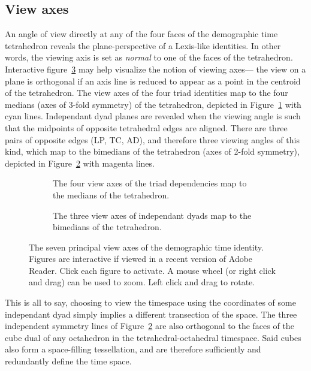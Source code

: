 \subsection{View axes}
An angle of view directly at any of the four faces of the demographic
time tetrahedron reveals the plane-perspective of a
Lexis-like identities. In other words, the viewing axis is set as
\emph{normal} to one of the faces of the tetrahedron. Interactive
figure~\ref{fig:viewaxes} may help visualize the notion of viewing axes--- the
view on a plane is orthogonal if an axis line is reduced to appear as a point in
the centroid of the tetrahedron. The view axes of the four triad identities map
to the four medians (axes of 3-fold symmetry) of the tetrahedron, depicted in
Figure~\ref{fig:depviewaxes} with cyan lines.
Independant dyad planes are revealed when the viewing angle is such that the midpoints of opposite tetrahedral edges are aligned. There are three pairs of
opposite edges (LP, TC, AD), and therefore three viewing angles of this kind,
which map to the bimedians of the tetrahedron (axes of 2-fold symmetry),
depicted in Figure~\ref{fig:indepviewaxes} with magenta lines.

\begin{figure}
\begin{subfigure}{.48\textwidth}

\caption{The four view axes of the triad dependencies map to the medians of the
tetrahedron.}
\label{fig:depviewaxes}
\end{subfigure}
\begin{subfigure}{.48\textwidth}

\caption{The three view axes of independant dyads map to the bimedians of the
tetrahedron.}
\label{fig:indepviewaxes}
\end{subfigure}
\caption{The seven principal view axes of the demographic time identity.
Figures are interactive if viewed in a recent version of Adobe Reader. Click
each figure to activate. A mouse wheel (or right click and drag) can be used to
zoom. Left click and drag to rotate.}
\label{fig:viewaxes}
\end{figure}

This is all to say, choosing to view the timespace using the coordinates of
some independant dyad simply implies a different transection of the space.
The three independent symmetry lines of Figure~\ref{fig:indepviewaxes} are
also orthogonal to the faces of the cube dual of any octahedron in the
tetrahedral-octahedral timespace. Said cubes also form a space-filling
tessellation, and are therefore sufficiently and redundantly define the time
space.

